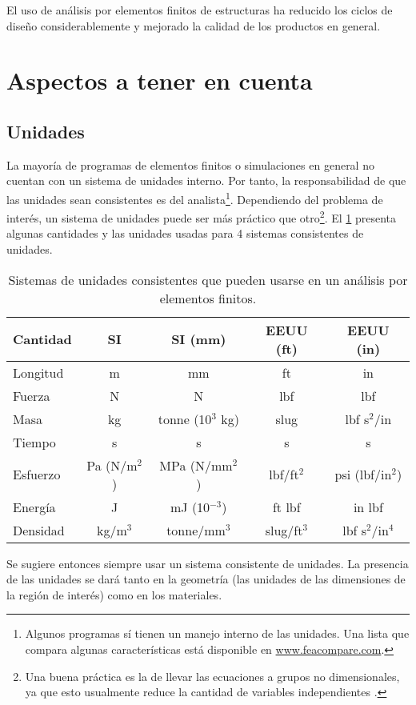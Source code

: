 El uso de análisis por elementos finitos de estructuras ha reducido los ciclos de diseño considerablemente y mejorado la calidad de los productos en general. 

\section{Aspectos a tener en cuenta}


\subsection{Unidades}
La mayoría de programas de elementos finitos o simulaciones en general no cuentan con un sistema de unidades interno. Por tanto, la responsabilidad de que las unidades sean consistentes es del analista\footnote{Algunos programas sí tienen un manejo interno de las unidades. Una lista que compara algunas características está disponible en \url{www.feacompare.com}.}. Dependiendo del problema de interés, un sistema de unidades puede ser más práctico que otro\footnote{Una buena práctica es la de llevar las ecuaciones a grupos no dimensionales, ya que esto usualmente reduce la cantidad de variables independientes \cite{book:langtangen2016scaling}.}. El \cref{tab:sistema_unidades} presenta algunas cantidades y las unidades usadas para 4 sistemas consistentes de unidades.
\begin{table}[H]
\centering
\begin{tabular}{lcccc}
\hline 
\textbf{Cantidad} & \textbf{SI} & \textbf{SI (mm)} & \textbf{EEUU (ft)} & \textbf{EEUU (in)} \\ 
\hline 
Longitud & m & mm & ft & in \\ 
Fuerza & N & N & lbf & lbf \\ 
Masa & kg & tonne (10$^3$ kg) & slug & lbf s$^2$/in \\ 
Tiempo & s & s & s & s \\ 
Esfuerzo & Pa (N/m$^2$) & MPa (N/mm$^2$) & lbf/ft$^2$ & psi (lbf/in$^2$) \\ 
Energía & J & mJ (10$^{-3}$) & ft lbf & in lbf \\ 
Densidad & kg/m$^3$ & tonne/mm$^3$ & slug/ft$^3$ & lbf s$^2$/in$^4$ \\ 
\hline 
\end{tabular}
\caption{Sistemas de unidades consistentes que pueden usarse en un análisis por elementos finitos.}
\label{tab:sistema_unidades}
\end{table}

Se sugiere entonces siempre usar un sistema consistente de unidades. La presencia de las unidades se dará tanto en la geometría (las unidades de las dimensiones de la región de interés) como en los materiales.

